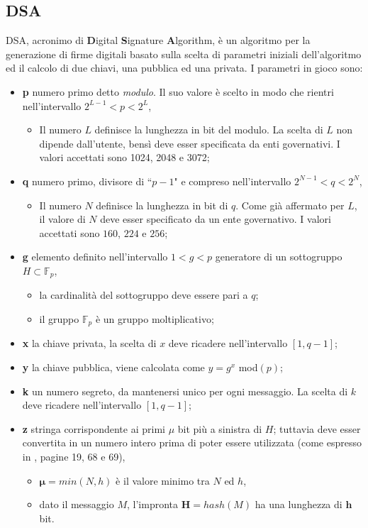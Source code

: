 \documentclass[a4paper,12pt]{tesiinfo}
\begin{document}
\subsection{DSA}
DSA, acronimo di \textbf{D}igital \textbf{S}ignature \textbf{A}lgorithm, \`e un algoritmo per la generazione di firme digitali \cite{dss} basato sulla scelta di parametri iniziali dell'algoritmo ed il calcolo di due chiavi, una pubblica ed una privata.
I parametri in gioco sono:
\begin{itemize}
 \item \textbf{p} numero primo detto \textit{modulo}. Il suo valore \`e scelto in modo che rientri nell'intervallo $2^{L-1}<p<2^L$,
    \begin{itemize}
     \item Il numero $L$ definisce la lunghezza in bit del modulo. La scelta di $L$ non dipende dall'utente, bens\`i deve esser specificata da enti governativi. I valori accettati sono 1024, 2048 e 3072;
    \end{itemize}
 \item \textbf{q} numero primo, divisore di ``$p-1$" e compreso nell'intervallo $2^{N-1}<q<2^N$,
    \begin{itemize}
     \item Il numero $N$ definisce la lunghezza in bit di $q$. Come gi\`a affermato per $L$, il valore di $N$ deve esser specificato da un ente governativo. I valori accettati sono $160$, $224$ e $256$;
    \end{itemize}
 \item \textbf{g} elemento definito nell'intervallo $1<g<p$ generatore di un sottogruppo $H \subset \mathbb{F}_p$,
 \begin{itemize}
  \item la cardinalit\`a del sottogruppo deve essere pari a $q$;
  \item il gruppo $\mathbb{F}_p$ \`e un gruppo moltiplicativo;
 \end{itemize}
  \item \textbf{x} la chiave privata, la scelta di $x$ deve ricadere nell'intervallo $[1, q-1]$;
 \item \textbf{y} la chiave pubblica, viene calcolata come $y=g^x$ mod$(p)$;
 \item \textbf{k} un numero segreto, da mantenersi unico per ogni messaggio. La scelta di $k$ deve ricadere nell'intervallo $[1, q-1]$;
 \item \textbf{z} stringa corrispondente ai primi $\mu$ bit pi\`u a sinistra di $H$; tuttavia deve esser convertita in un numero intero prima di poter essere utilizzata (come espresso in \cite{dss}, pagine 19, 68 e 69),
 \begin{itemize}
  \item $\mathbold{\mu} = min(N, h)$ \`e il valore minimo tra $N$ ed $h$,
  \item dato il messaggio $M$, l'impronta $\mathbold{H} = hash(M)$ ha una lunghezza di $\mathbold{h}$ bit.
 \end{itemize}
\end{itemize}
\end{document}
